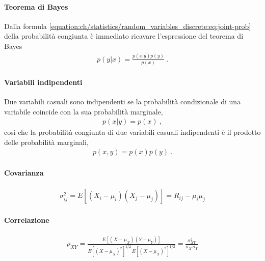 \documentclass[letterpaper,10pt,italian]{jupyterBook}
\begin{document}
\paragraph{Teorema di Bayes}
\label{\detokenize{ch/statistics/random_variables_discrete:teorema-di-bayes}}\label{\detokenize{ch/statistics/random_variables_discrete:statistics-hs-random-variables-bayes-discrete}}
\sphinxAtStartPar
Dalla formula \eqref{equation:ch/statistics/random_variables_discrete:eq:joint-prob} della probabilità congiunta è immediato ricavare l’espressione del teorema di Bayes
\begin{equation*}
\begin{split}p(y|x) = \frac{p(x|y)p(y)}{p(x)} \ .\end{split}
\end{equation*}

\paragraph{Variabili indipendenti}
\label{\detokenize{ch/statistics/random_variables_discrete:variabili-indipendenti}}
\sphinxAtStartPar
Due variabili casuali sono indipendenti se la probabilità condizionale di una variabile coincide con la sua probabilità marginale,
\begin{equation*}
\begin{split}p(x|y) = p(x) \ ,\end{split}
\end{equation*}
\sphinxAtStartPar
così che la probabilità congiunta di due variabili casuali indipendenti è il prodotto delle probabilità marginali,
\begin{equation*}
\begin{split}p(x,y) = p(x)p(y) \ .\end{split}
\end{equation*}

\paragraph{Covarianza}
\label{\detokenize{ch/statistics/random_variables_discrete:covarianza}}\begin{equation*}
\begin{split}\sigma^2_{ij} = E[(X_i-\mu_i)(X_j-\mu_j)] = R_{ij} - \mu_i \mu_j\end{split}
\end{equation*}

\paragraph{Correlazione}
\label{\detokenize{ch/statistics/random_variables_discrete:correlazione}}\begin{equation*}
\begin{split}\rho_{XY} = \frac{E[(X-\mu_X)(Y-\mu_Y)]}{E[(X-\mu_X)^2]^{1/2} \, E[(X-\mu_X)^2]^{1/2}} = \frac{\sigma_{XY}^2}{\sigma_X \, \sigma_Y}\end{split}
\end{equation*}
\sphinxstepscope
\end{document}
